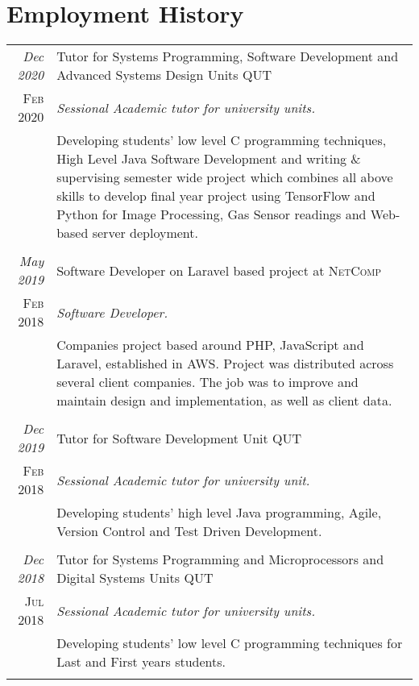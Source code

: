\documentclass[a4paper,12pt]{article}
\begin{document}
\section{Employment History}
\begin{tabular}{r|p{11cm}}
    \emph{Dec 2020} &Tutor for Systems Programming, Software Development and Advanced Systems Design Units \textsc{QUT} \\\textsc{Feb 2020}&\emph{Sessional Academic tutor for university units.}\\&\footnotesize{Developing students' low level C programming techniques, High Level Java Software Development and writing \& supervising semester wide project which combines all above skills to develop final year project using TensorFlow and Python for Image Processing, Gas Sensor readings and Web-based server deployment.}\\\multicolumn{2}{c}{} \\ [1pc]
	
	\emph{May 2019} & Software Developer on Laravel based project at \textsc{NetComp} \\\textsc{Feb 2018}&\emph{Software Developer.}\\&\footnotesize{Companies project based around PHP, JavaScript and Laravel, established in AWS. Project was distributed across several client companies. The job was to improve and maintain design and implementation, as well as client data.}\\\multicolumn{2}{c}{} \\ [1pc]
	
	\emph{Dec 2019} &Tutor for Software Development Unit \textsc{QUT} \\\textsc{Feb 2018}&\emph{Sessional Academic tutor for university unit.}\\&\footnotesize{Developing students' high level Java programming, Agile, Version Control and Test Driven Development.}\\\multicolumn{2}{c}{} \\ [1pc]
	
	\emph{Dec 2018} &Tutor for Systems Programming and Microprocessors and Digital Systems Units \textsc{QUT} \\\textsc{Jul 2018}&\emph{Sessional Academic tutor for university units.}\\&\footnotesize{Developing students' low level C programming techniques for Last and First years students.}\\\multicolumn{2}{c}{} \\ [1pc]
	

\end{tabular}
\end{document}
